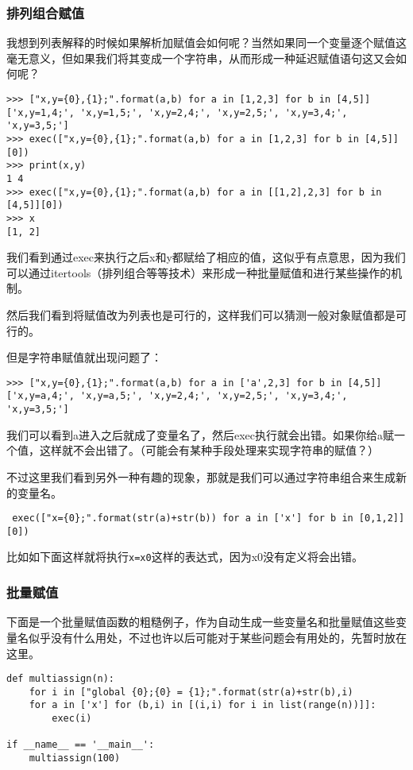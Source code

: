 \documentclass[12pt,oneside]{book}
\begin{document}
\begin{common-format}
\subsubsection{排列组合赋值}
我想到列表解释的时候如果解析加赋值会如何呢？当然如果同一个变量逐个赋值这毫无意义，但如果我们将其变成一个字符串，从而形成一种延迟赋值语句这又会如何呢？
\begin{Verbatim}
>>> ["x,y={0},{1};".format(a,b) for a in [1,2,3] for b in [4,5]]
['x,y=1,4;', 'x,y=1,5;', 'x,y=2,4;', 'x,y=2,5;', 'x,y=3,4;', 'x,y=3,5;']
>>> exec(["x,y={0},{1};".format(a,b) for a in [1,2,3] for b in [4,5]][0])
>>> print(x,y)
1 4
>>> exec(["x,y={0},{1};".format(a,b) for a in [[1,2],2,3] for b in [4,5]][0])
>>> x
[1, 2]
\end{Verbatim}
我们看到通过exec来执行之后x和y都赋给了相应的值，这似乎有点意思，因为我们可以通过itertools（排列组合等等技术）来形成一种批量赋值和进行某些操作的机制。

然后我们看到将赋值改为列表也是可行的，这样我们可以猜测一般对象赋值都是可行的。

但是字符串赋值就出现问题了：
\begin{Verbatim}
>>> ["x,y={0},{1};".format(a,b) for a in ['a',2,3] for b in [4,5]]
['x,y=a,4;', 'x,y=a,5;', 'x,y=2,4;', 'x,y=2,5;', 'x,y=3,4;', 'x,y=3,5;']
\end{Verbatim}
我们可以看到a进入之后就成了变量名了，然后exec执行就会出错。如果你给a赋一个值，这样就不会出错了。（可能会有某种手段处理来实现字符串的赋值？）

不过这里我们看到另外一种有趣的现象，那就是我们可以通过字符串组合来生成新的变量名。
\begin{Verbatim}
 exec(["x={0};".format(str(a)+str(b)) for a in ['x'] for b in [0,1,2]][0])
\end{Verbatim}
比如如下面这样就将执行\verb+x=x0+这样的表达式，因为x0没有定义将会出错。


\subsubsection{批量赋值}
下面是一个批量赋值函数的粗糙例子，作为自动生成一些变量名和批量赋值这些变量名似乎没有什么用处，不过也许以后可能对于某些问题会有用处的，先暂时放在这里。
\begin{Verbatim}
def multiassign(n):
    for i in ["global {0};{0} = {1};".format(str(a)+str(b),i) 
    for a in ['x'] for (b,i) in [(i,i) for i in list(range(n))]]:
        exec(i)

if __name__ == '__main__':
    multiassign(100)
\end{Verbatim}


\end{common-format}
\end{document}

